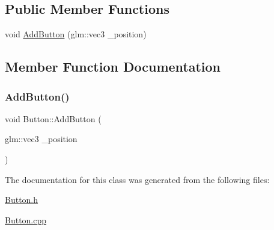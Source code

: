 \subsection*{Public Member Functions}
\begin{DoxyCompactItemize}
\item 
void \mbox{\hyperlink{class_button_a02344644a142f432e211f2352e40aaa3}{Add\+Button}} (glm\+::vec3 \+\_\+position)
\end{DoxyCompactItemize}


\subsection{Member Function Documentation}
\mbox{\label{class_button_a02344644a142f432e211f2352e40aaa3}} 
\subsubsection{\texorpdfstring{Add\+Button()}{AddButton()}}
{\footnotesize\ttfamily void Button\+::\+Add\+Button (\begin{DoxyParamCaption}\item[{glm\+::vec3}]{\+\_\+position }\end{DoxyParamCaption})}



The documentation for this class was generated from the following files\+:\begin{DoxyCompactItemize}
\item 
\mbox{\hyperlink{_button_8h}{Button.\+h}}\item 
\mbox{\hyperlink{_button_8cpp}{Button.\+cpp}}\end{DoxyCompactItemize}
